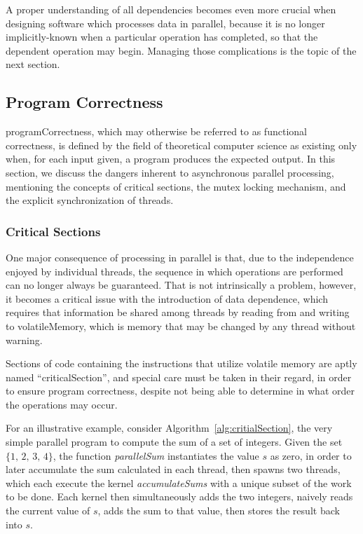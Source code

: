 A proper understanding of all dependencies becomes even more crucial when designing software which processes data in parallel, because it is no longer implicitly-known when a particular operation has completed, so that the dependent operation may begin. Managing those complications is the topic of the next section.

%
%
%
%
\subsection{Program Correctness}
\label{ch2sPPssPC}
\Gls{programCorrectness}, which may otherwise be referred to as functional correctness, is defined by the field of theoretical computer science as existing only when, for each input given, a program produces the expected output. In this section, we discuss the dangers inherent to asynchronous parallel processing, mentioning the concepts of critical sections, the mutex locking mechanism, and the explicit synchronization of threads.

%
%
\subsubsection{Critical Sections}
\label{ch2sPPssPCsssCS}
One major consequence of processing in parallel is that, due to the independence enjoyed by individual threads, the sequence in which operations are performed can no longer always be guaranteed. That is not intrinsically a problem, however, it becomes a critical issue with the introduction of data dependence, which requires that information be shared among threads by reading from and writing to \gls{volatileMemory}, which is memory that may be changed by any thread without warning.

Sections of code containing the instructions that utilize volatile memory are aptly named ``\gls{criticalSection}'', and special care must be taken in their regard, in order to ensure program correctness, despite not being able to determine in what order the operations may occur.

For an illustrative example, consider Algorithm~\ref{alg:critialSection}, the very simple parallel program to compute the sum of a set of integers. Given the set $\{1,\,2,\,3,\,4\}$, the function \textit{parallelSum} instantiates the value $s$ as zero, in order to later accumulate the sum calculated in each thread, then spawns two threads, which each execute the kernel \textit{accumulateSums} with a unique subset of the work to be done. Each kernel then simultaneously adds the two integers, naively reads the current value of $s$, adds the sum to that value, then stores the result back into $s$.

